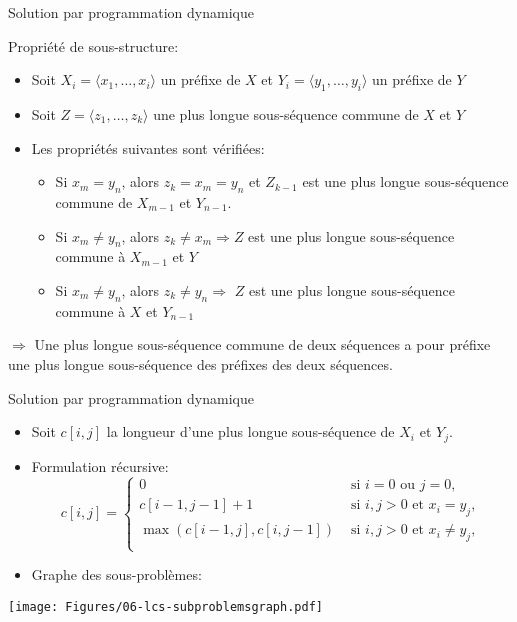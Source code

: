 \begin{frame}{Solution par programmation dynamique}

Propriété de sous-structure:
\begin{itemize}
\item Soit $X_i=\langle x_1,\ldots,x_i\rangle$ un préfixe de $X$ et
  $Y_i=\langle y_1,\ldots,y_i\rangle$ un préfixe de $Y$
\item Soit $Z=\langle z_1,\ldots,z_k\rangle$ une plus longue sous-séquence commune de $X$ et $Y$
\item Les propriétés suivantes sont vérifiées:
\begin{itemize}
\item Si $x_m=y_n$, alors $z_k=x_m=y_n$ et $Z_{k-1}$ est une plus
  longue sous-séquence commune de $X_{m-1}$ et $Y_{n-1}$.
\item Si $x_m\neq y_n$, alors $z_k\neq x_m\Rightarrow Z$ est une plus
  longue sous-séquence commune à $X_{m-1}$ et $Y$
\item Si $x_m\neq y_n$, alors $z_k\neq y_n\Rightarrow$ $Z$ est une
  plus longue sous-séquence commune à $X$ et $Y_{n-1}$
\end{itemize}
\end{itemize}
\alert{$\Rightarrow$} Une plus longue sous-séquence commune de deux séquences a pour préfixe
une plus longue sous-séquence des préfixes des deux séquences.

\end{frame}

\begin{frame}{Solution par programmation dynamique}
\begin{itemize}
\item Soit $c[i,j]$ la longueur d'une plus longue sous-séquence de $X_i$ et $Y_j$.
\item Formulation récursive:
\[c[i,j]=\left\{
\begin{array}{ll}
0 & \mbox{ si } i=0\mbox{ ou }j=0,\\
c[i-1,j-1]+1 & \mbox{ si }i,j>0\mbox{ et }x_i=y_j,\\
\max(c[i-1,j],c[i,j-1]) & \mbox{ si }i,j>0\mbox{ et }x_i\neq y_j,\\
\end{array}
\right.
\]
\item Graphe des sous-problèmes:
\end{itemize}

\centerline{\texttt{[image: Figures/06-lcs-subproblemsgraph.pdf]}}


\end{frame}

